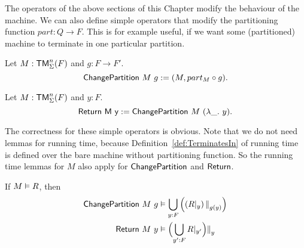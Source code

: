 The operators of the above sections of this Chapter modify the behaviour of the machine.  We can also define simple operators that modify the
partitioning function $part : Q \to F$.  This is for example useful, if we want some (partitioned) machine to terminate in one particular partition.

\begin{definition}[$\MS{ChangePartition}$][ChangePartition]
  Let $M:\mathsf{TM}_\Sigma^n(F)$ and $g : F \to F'$.
  \[ \mathsf{ChangePartition}~M~g := (M, part_M \circ g). \]
\end{definition}

\begin{definition}[$\MS{Return}$][Return]
  Let $M:\mathsf{TM}_\Sigma^n(F)$ and $y:F$.
  \[ \mathsf{Return~M~y} := \mathsf{ChangePartition}~M~(\lambda \_.~y). \]
\end{definition}

The correctness for these simple operators is obvious.  Note that we do not need lemmas for running time, because Definition~\ref{def:TerminatesIn} of
running time is defined over the bare machine without partitioning function.  So the running time lemmas for $M$ also apply for $\MS{ChangePartition}$
and $\MS{Return}$.
\begin{lemma}
  If $M \mathrel{\vDash} R$, then
  \begin{alignat*}{1}
    \mathsf{ChangePartition}~M~g & \mathrel{\vDash} \bigcup_{y:F} \left( \left(R {|}_{y}\right) {|\mkern-1.5mu|}_{g(y)} \right) \\
    \mathsf{Return}~M~y          & \mathrel{\vDash} \Bigl( \bigcup_{y':F} R {|}_{y'} \Bigr) {|\mkern-1.5mu|}_{y}
  \end{alignat*}
\end{lemma}



